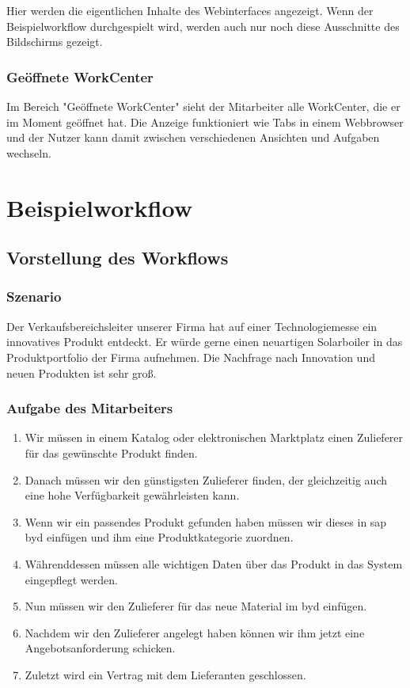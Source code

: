 Hier werden die eigentlichen Inhalte des Webinterfaces angezeigt. Wenn der Beispielworkflow durchgespielt wird, werden auch nur noch diese Ausschnitte des Bildschirms gezeigt.

\subsubsection{Geöffnete WorkCenter}

Im Bereich "Geöffnete WorkCenter" sieht der Mitarbeiter alle WorkCenter, die er im Moment geöffnet hat. Die Anzeige funktioniert wie Tabs in einem Webbrowser und der Nutzer kann damit zwischen verschiedenen Ansichten und Aufgaben wechseln.

\section{Beispielworkflow}

\subsection{Vorstellung des Workflows}
\label{sec:byd-bsp-vorstellung}

\subsubsection{Szenario}

Der Verkaufsbereichsleiter unserer Firma hat auf einer Technologiemesse ein innovatives Produkt entdeckt. Er würde gerne einen neuartigen Solarboiler in das Produktportfolio der Firma aufnehmen. Die Nachfrage nach Innovation und neuen Produkten ist sehr groß.

\subsubsection{Aufgabe des Mitarbeiters}

\begin{enumerate}
 \item Wir müssen in einem Katalog oder elektronischen Marktplatz einen Zulieferer für das gewünschte Produkt finden.
 \item Danach müssen wir den günstigsten Zulieferer finden, der gleichzeitig auch eine hohe Verfügbarkeit gewährleisten kann.
 \item Wenn wir ein passendes Produkt gefunden haben müssen wir dieses in \gls{sap} \gls{byd} einfügen und ihm eine Produktkategorie zuordnen.
 \item Währenddessen müssen alle wichtigen Daten über das Produkt in das System eingepflegt werden.
 \item Nun müssen wir den Zulieferer für das neue Material im \gls{byd} einfügen.
 \item Nachdem wir den Zulieferer angelegt haben können wir ihm jetzt eine Angebotsanforderung schicken.
 \item Zuletzt wird ein Vertrag mit dem Lieferanten geschlossen. 
 \end{enumerate}

